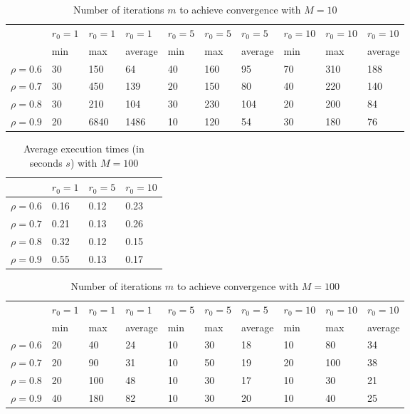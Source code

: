 \documentclass[a4paper,11pt,openright]{report}
\begin{document}
\begin{table}[H]
\centering
\addtolength{\leftskip}{-1.5cm}
\addtolength{\rightskip}{-1.5cm}
\begin{tabular}{|c|lllllllll|}
\hline
$ $ & $r_0 = 1$ & $r_0 = 1$ & $r_0 = 1$ & $r_0 = 5$ & $r_0 = 5$ & $r_0 = 5$ & $r_0 = 10$ & $r_0 = 10$ & $r_0 = 10$  \\
$ $ & min & max & average & min & max & average & min & max & average \\ 
\hline
$\rho = 0.6$ & 30 & 150 & 64 & 40 & 160 & 95 & 70 & 310 & 188\\

$\rho = 0.7$ & 30 & 450 & 139 & 20 & 150 & 80 & 40 & 220 & 140\\

$\rho = 0.8$ & 30 & 210 & 104 & 30 & 230 & 104 & 20 & 200 & 84\\

$\rho = 0.9$ & 20 & 6840 & 1486 & 10 & 120 & 54 & 30 & 180 & 76\\
\hline
\end{tabular}
\caption{Number of iterations $m$ to achieve convergence with $M = 10$}
\end{table}
\begin{table}[H]
\centering
\addtolength{\leftskip}{-1.5cm}
\addtolength{\rightskip}{-1.5cm}
\begin{tabular}{|c|lll|}
\hline
$ $ & $r_0 = 1$ & $r_0 = 5$ & $r_0 = 10$ \\
\hline
$\rho = 0.6$ & 0.16 & 0.12 & 0.23\\

$\rho = 0.7$ & 0.21 & 0.13 & 0.26 \\

$\rho = 0.8$ & 0.32 & 0.12 & 0.15 \\

$\rho = 0.9$ & 0.55 & 0.13 & 0.17 \\
\hline
\end{tabular}
\caption{Average execution
 times (in seconds $s$) with $M = 100$}
\end{table}
\begin{table}[H]
\centering
\addtolength{\leftskip}{-1.5cm}
\addtolength{\rightskip}{-1.5cm}
\begin{tabular}{|c|lllllllll|}
\hline
$ $ & $r_0 = 1$ & $r_0 = 1$ & $r_0 = 1$ & $r_0 = 5$ & $r_0 = 5$ & $r_0 = 5$ & $r_0 = 10$ & $r_0 = 10$ & $r_0 = 10$  \\
$ $ & min & max & average & min & max & average & min & max & average \\ 
\hline
$\rho = 0.6$ & 20 & 40 & 24 & 10 & 30 & 18 & 10 & 80 & 34\\

$\rho = 0.7$ & 20 & 90 & 31 & 10 & 50 & 19 & 20 & 100 & 38\\

$\rho = 0.8$ & 20 & 100 & 48 & 10 & 30 & 17 & 10 & 30 & 21\\

$\rho = 0.9$ & 40 & 180 & 82 & 10 & 30 & 20 & 10 & 40 & 25\\
\hline
\end{tabular}
\caption{Number of iterations $m$ to achieve convergence with $M = 100$}
\end{table}
\end{document}
